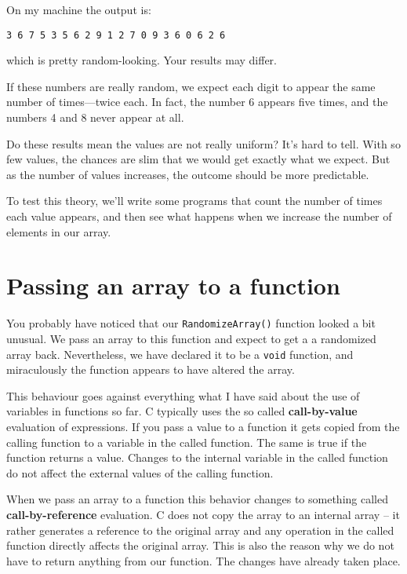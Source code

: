 %
On my machine the output is:

\begin{verbatim}
3 6 7 5 3 5 6 2 9 1 2 7 0 9 3 6 0 6 2 6 
\end{verbatim}
\nopagebreak%
which is pretty random-looking.  Your results may differ.

If these numbers are really random,
we expect each digit to appear the same number of times---twice
each.  In fact, the number 6 appears five times, and the numbers 4
and 8 never appear at all.

Do these results mean the values are not really uniform?  It's
hard to tell.  With so few values, the chances are slim
that we would get exactly what we expect.  But as the number
of values increases, the outcome should be more predictable.

To test this theory, we'll write some programs that count the
number of times each value appears, and then see what happens
when we increase the number of elements in our array.

\section{Passing an array to a function}
\label{Passing an array to a function}
You probably have noticed that our {\tt RandomizeArray()} function 
looked a bit unusual. We pass an array to this function and expect 
to get a a randomized array back. Nevertheless, we have declared it to 
be a {\tt void} function, and miraculously the function appears to have 
altered the array.

This behaviour goes against everything what I have said about the
use of variables in functions so far.
C typically uses the so called {\bf call-by-value} evaluation of
expressions. If you pass a value to a function it gets copied from
the calling function to a variable in the called function. The same
is true if the function returns a value.
Changes to the internal variable in the called function do not affect the external 
values of the calling function.

When we pass an array to a function this behavior changes to
something called {\bf call-by-reference} evaluation.
C does not copy the array to an internal array --  it rather generates a
reference to the original array and any operation in the called function 
directly affects the original array.
This is also the reason why we do not have to return anything from our 
function. The changes have already taken place. 

